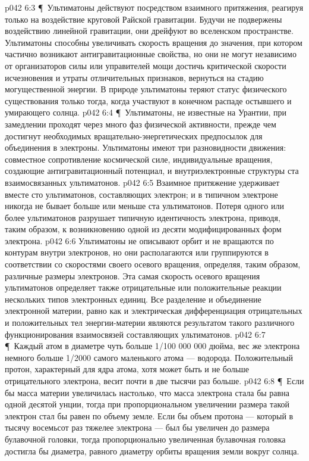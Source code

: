 \vs p042 6:3 \P\ Ультиматоны действуют посредством взаимного притяжения, реагируя только на воздействие круговой Райской гравитации. Будучи не подвержены воздействию линейной гравитации, они дрейфуют во вселенском пространстве. Ультиматоны способны увеличивать скорость вращения до значения, при котором частично возникают антигравитационные свойства, но они не могут независимо от организаторов силы или управителей мощи достичь критической скорости исчезновения и утраты отличительных признаков, вернуться на стадию могущественной энергии. В природе ультиматоны теряют статус физического существования только тогда, когда участвуют в конечном распаде остывшего и умирающего солнца.
\vs p042 6:4 \P\ Ультиматоны, не известные на Урантии, при замедлении проходят через много фаз физической активности, прежде чем достигнут необходимых вращательно\hyp{}энергетических предпосылок для объединения в электроны. Ультиматоны имеют три разновидности движения: совместное сопротивление космической силе, индивидуальные вращения, создающие антигравитационный потенциал, и внутриэлектронные структуры ста взаимосвязанных ультиматонов.
\vs p042 6:5 Взаимное притяжение удерживает вместе сто ультиматонов, составляющих электрон; и в типичном электроне никогда не бывает больше или меньше ста ультиматонов. Потеря одного или более ультиматонов разрушает типичную идентичность электрона, приводя, таким образом, к возникновению одной из десяти модифицированных форм электрона.
\vs p042 6:6 Ультиматоны не описывают орбит и не вращаются по контурам внутри электронов, но они располагаются или группируются в соответствии со скоростями своего осевого вращения, определяя, таким образом, различные размеры электронов. Эта самая скорость осевого вращения ультиматонов определяет также отрицательные или положительные реакции нескольких типов электронных единиц. Все разделение и объединение электронной материи, равно как и электрическая дифференциация отрицательных и положительных тел энергии\hyp{}материи являются результатом такого различного функционирования взаимосвязей составляющих ультиматонов.
\vs p042 6:7 \P\ Каждый атом в диаметре чуть больше 1/100 000 000 дюйма, вес же электрона немного больше 1/2000 самого маленького атома --- водорода. Положительный протон, характерный для ядра атома, хотя может быть и не больше отрицательного электрона, весит почти в две тысячи раз больше.
\vs p042 6:8 \P\ Если бы масса материи увеличилась настолько, что масса электрона стала бы равна одной десятой унции, тогда при пропорциональном увеличении размера такой электрон стал бы равен по объему земле. Если бы объем протона --- который в тысячу восемьсот раз тяжелее электрона --- был бы увеличен до размера булавочной головки, тогда пропорционально увеличенная булавочная головка достигла бы диаметра, равного диаметру орбиты вращения земли вокруг солнца.
